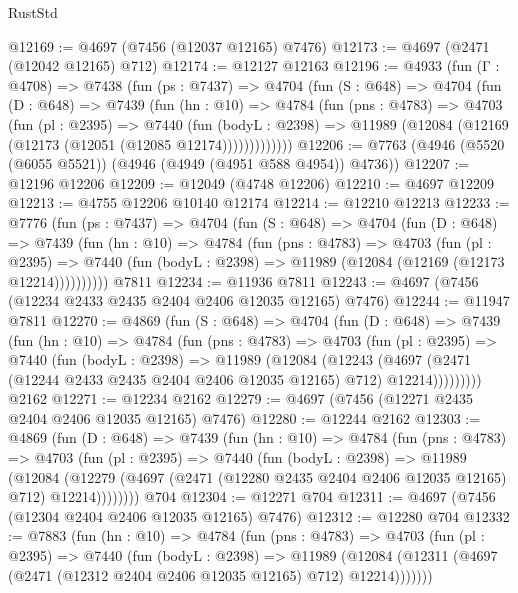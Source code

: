 \begin{lexlean}{RustStd}
\begin{coremodule}
@12169 := @4697 (@7456 (@12037 @12165) @7476)
@12173 := @4697 (@2471 (@12042 @12165) @712)
@12174 := @12127 @12163
@12196 := @4933
    (fun (Γ : @4708) =>
    @7438
      (fun (ps : @7437) =>
      @4704
        (fun (S : @648) =>
        @4704
          (fun (D : @648) =>
          @7439
            (fun (hn : @10) =>
            @4784
              (fun (pns : @4783) =>
              @4703
                (fun (pl : @2395) =>
                @7440
                  (fun (bodyL : @2398) =>
                  @11989 (@12084 (@12169 (@12173 (@12051 (@12085 @12174)))))))))))))
@12206 := @7763 (@4946 (@5520 (@6055 @5521)) (@4946 (@4949 (@4951 @588 @4954)) @4736))
@12207 := @12196 @12206
@12209 := @12049 (@4748 @12206)
@12210 := @4697 @12209
@12213 := @4755 @12206 @10140 @12174
@12214 := @12210 @12213
@12233 := @7776
    (fun (ps : @7437) =>
    @4704
      (fun (S : @648) =>
      @4704
        (fun (D : @648) =>
        @7439
          (fun (hn : @10) =>
          @4784
            (fun (pns : @4783) =>
            @4703
              (fun (pl : @2395) =>
              @7440 (fun (bodyL : @2398) => @11989 (@12084 (@12169 (@12173 @12214))))))))))
    @7811
@12234 := @11936 @7811
@12243 := @4697 (@7456 (@12234 @2433 @2435 @2404 @2406 @12035 @12165) @7476)
@12244 := @11947 @7811
@12270 := @4869
    (fun (S : @648) =>
    @4704
      (fun (D : @648) =>
      @7439
        (fun (hn : @10) =>
        @4784
          (fun (pns : @4783) =>
          @4703
            (fun (pl : @2395) =>
            @7440
              (fun (bodyL : @2398) =>
              @11989
                (@12084
                  (@12243
                    (@4697
                      (@2471 (@12244 @2433 @2435 @2404 @2406 @12035 @12165) @712)
                      @12214)))))))))
    @2162
@12271 := @12234 @2162
@12279 := @4697 (@7456 (@12271 @2435 @2404 @2406 @12035 @12165) @7476)
@12280 := @12244 @2162
@12303 := @4869
    (fun (D : @648) =>
    @7439
      (fun (hn : @10) =>
      @4784
        (fun (pns : @4783) =>
        @4703
          (fun (pl : @2395) =>
          @7440
            (fun (bodyL : @2398) =>
            @11989
              (@12084
                (@12279 (@4697 (@2471 (@12280 @2435 @2404 @2406 @12035 @12165) @712) @12214))))))))
    @704
@12304 := @12271 @704
@12311 := @4697 (@7456 (@12304 @2404 @2406 @12035 @12165) @7476)
@12312 := @12280 @704
@12332 := @7883
    (fun (hn : @10) =>
    @4784
      (fun (pns : @4783) =>
      @4703
        (fun (pl : @2395) =>
        @7440
          (fun (bodyL : @2398) =>
          @11989
            (@12084 (@12311 (@4697 (@2471 (@12312 @2404 @2406 @12035 @12165) @712) @12214)))))))

\end{coremodule}
\end{lexlean}
